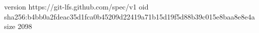 version https://git-lfs.github.com/spec/v1
oid sha256:b4bb0a2fdeac35d1fca0b45209d22419a71b15d19f5d88b39c015e8baa8e8e4a
size 2098
